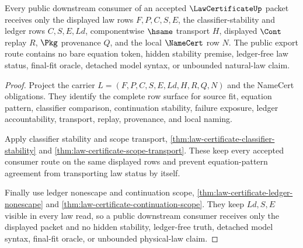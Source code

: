 \begin{theorem}
\label{thm:law-certificate-public-export-route}
Every public downstream consumer of an accepted $\LawCertificateUp$ packet receives only the displayed law rows $F,P,C,S,E$, the classifier-stability and ledger rows $C,S,E,Ld$, componentwise $\hsame$ transport $H$, displayed $\Cont$ replay $R$, $\Pkg$ provenance $Q$, and the local $\NameCert$ row $N$. The public export route contains no bare equation token, hidden stability premise, ledger-free law status, final-fit oracle, detached model syntax, or unbounded natural-law claim.
\end{theorem}
\begin{proof}
Project the carrier $L=(F,P,C,S,E,Ld,H,R,Q,N)$ and the NameCert obligations. They identify the complete row surface for source fit, equation pattern, classifier comparison, continuation stability, failure exposure, ledger accountability, transport, replay, provenance, and local naming.

Apply classifier stability and scope transport, \autoref{thm:law-certificate-classifier-stability} and \autoref{thm:law-certificate-scope-transport}. These keep every accepted consumer route on the same displayed rows and prevent equation-pattern agreement from transporting law status by itself.

Finally use ledger nonescape and continuation scope, \autoref{thm:law-certificate-ledger-nonescape} and \autoref{thm:law-certificate-continuation-scope}. They keep $Ld,S,E$ visible in every law read, so a public downstream consumer receives only the displayed packet and no hidden stability, ledger-free truth, detached model syntax, final-fit oracle, or unbounded physical-law claim.
\end{proof}

